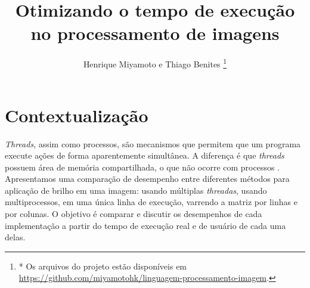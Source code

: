 \documentclass[a4paper, 10pt, conference]{ieeeconf}
\title{\LARGE \bf Otimizando o tempo de execução no processamento de imagens}
\author{Henrique Miyamoto e Thiago Benites \thanks{* Os arquivos do projeto estão disponíveis em \url{https://github.com/miyamotohk/linguagem-processamento-imagem}.}}
\begin{document}
\maketitle
\thispagestyle{empty}
\pagestyle{empty}




\section{Contextualização}


\textit{Threads}, assim como processos, são mecanismos que permitem que um programa execute ações de forma aparentemente simultânea. A diferença é que \textit{threads} possuem área de memória compartilhada, o que não ocorre com processos \cite{alp}. Apresentamos uma comparação de desempenho entre diferentes métodos para aplicação de brilho em uma imagem: usando múltiplas \textit{threadas}, usando multiprocessos, em uma única linha de execução, varrendo a matriz por linhas e por colunas. O objetivo é comparar e discutir os desempenhos de cada implementação a partir do tempo de execução real e de usuário de cada uma delas.


\end{document}
